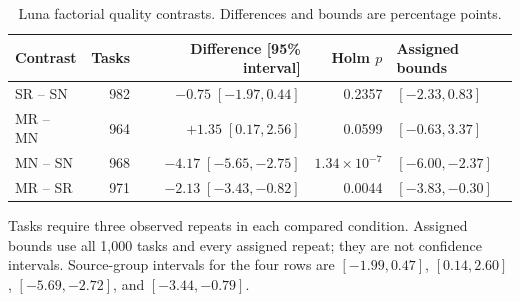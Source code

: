 \begin{table}[t]\centering
\caption{Luna factorial quality contrasts. Differences and bounds are percentage points.}
\label{tab:scale-contrasts}
\small
\begin{tabular}{@{}lrrrl@{}}\toprule
Contrast & Tasks & Difference [95\% interval] & Holm $p$ & Assigned bounds\\\midrule
SR -- SN & 982 & $-0.75\;[-1.97, 0.44]$ & 0.2357 & $[-2.33, 0.83]$\\
MR -- MN & 964 & $+1.35\;[0.17, 2.56]$ & 0.0599 & $[-0.63, 3.37]$\\
MN -- SN & 968 & $-4.17\;[-5.65,-2.75]$ & $1.34\!\times\!10^{-7}$ & $[-6.00,-2.37]$\\
MR -- SR & 971 & $-2.13\;[-3.43,-0.82]$ & 0.0044 & $[-3.83,-0.30]$\\
\bottomrule\end{tabular}
\par\smallskip\noindent Tasks require three observed repeats in each compared condition. Assigned bounds use all 1,000 tasks and every assigned repeat; they are not confidence intervals. Source-group intervals for the four rows are $[-1.99,0.47]$, $[0.14,2.60]$, $[-5.69,-2.72]$, and $[-3.44,-0.79]$.
\end{table}
